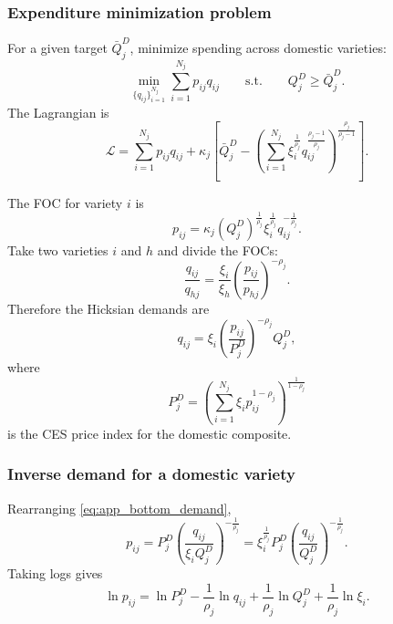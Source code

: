 \subsubsection{Expenditure minimization problem}

For a given target $\bar{Q}_j^D$, minimize spending across domestic varieties:
\[
\min_{\{q_{ij}\}_{i=1}^{N_j}}
\sum_{i=1}^{N_j} p_{ij} q_{ij}
\qquad \text{s.t.} \qquad
Q_j^D \geq \bar{Q}_j^D.
\]
The Lagrangian is
\[
\mathcal{L}
=
\sum_{i=1}^{N_j} p_{ij} q_{ij}
+
\kappa_j
\left[
\bar{Q}_j^D
-
\left(
\sum_{i=1}^{N_j}
\xi_i^{\frac{1}{\rho_j}} q_{ij}^{\frac{\rho_j-1}{\rho_j}}
\right)^{\frac{\rho_j}{\rho_j-1}}
\right].
\]

The FOC for variety $i$ is
\begin{equation}
p_{ij}
=
\kappa_j (Q_j^D)^{\frac{1}{\rho_j}}
\xi_i^{\frac{1}{\rho_j}}
q_{ij}^{-\frac{1}{\rho_j}}.
\label{eq:app_bottom_foc}
\end{equation}
Take two varieties $i$ and $h$ and divide the FOCs:
\[
\frac{q_{ij}}{q_{hj}}
=
\frac{\xi_i}{\xi_h}
\left( \frac{p_{ij}}{p_{hj}} \right)^{-\rho_j}.
\]
Therefore the Hicksian demands are
\begin{equation}
q_{ij}
=
\xi_i \left( \frac{p_{ij}}{P_j^D} \right)^{-\rho_j} Q_j^D,
\label{eq:app_bottom_demand}
\end{equation}
where
\begin{equation}
P_j^D
=
\left(
\sum_{i=1}^{N_j}
\xi_i p_{ij}^{1-\rho_j}
\right)^{\frac{1}{1-\rho_j}}
\label{eq:app_bottom_price_index}
\end{equation}
is the CES price index for the domestic composite.

\subsubsection{Inverse demand for a domestic variety}

Rearranging \eqref{eq:app_bottom_demand},
\begin{equation}
p_{ij}
=
P_j^D
\left( \frac{q_{ij}}{\xi_i Q_j^D} \right)^{-\frac{1}{\rho_j}}
=
\xi_i^{\frac{1}{\rho_j}} P_j^D \left( \frac{q_{ij}}{Q_j^D} \right)^{-\frac{1}{\rho_j}}.
\label{eq:app_bottom_inverse}
\end{equation}
Taking logs gives
\begin{equation}
\ln p_{ij}
=
\ln P_j^D
- \frac{1}{\rho_j} \ln q_{ij}
+ \frac{1}{\rho_j} \ln Q_j^D
+ \frac{1}{\rho_j} \ln \xi_i.
\label{eq:app_bottom_inverse_logs}
\end{equation}

